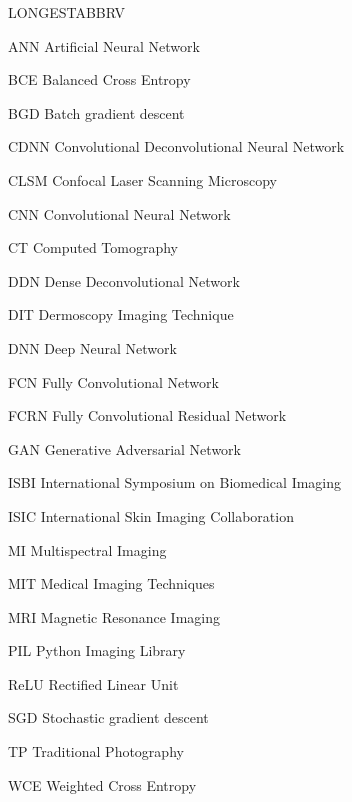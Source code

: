 \begin{theglossary}{LONGESTABBRV}
    \item[ANN] Artificial Neural Network
    \item[BCE] Balanced Cross Entropy
    \item[BGD] Batch gradient descent
    \item[CDNN] Convolutional Deconvolutional Neural Network
    \item[CLSM] Confocal Laser Scanning Microscopy
    \item[CNN] Convolutional Neural Network
    \item[CT] Computed Tomography
    \item[DDN] Dense Deconvolutional Network
    \item[DIT] Dermoscopy Imaging Technique
    \item[DNN] Deep Neural Network
    \item[FCN] Fully Convolutional Network
    \item[FCRN] Fully Convolutional Residual Network
    \item[GAN] Generative Adversarial Network
    \item[ISBI] International Symposium on Biomedical Imaging
    \item[ISIC] International Skin Imaging Collaboration
    \item[MI] Multispectral Imaging
    \item[MIT] Medical Imaging Techniques
    \item[MRI] Magnetic Resonance Imaging
    \item[PIL] Python Imaging Library
    \item[ReLU] Rectified Linear Unit
    \item[SGD] Stochastic gradient descent
    \item[TP] Traditional Photography
    \item[WCE] Weighted Cross Entropy
\end{theglossary}
